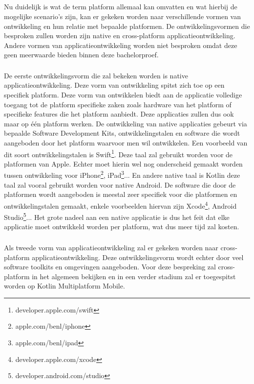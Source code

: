\subsection{}
\label{sec:SVZontwikkelingsvormen}

Nu duidelijk is wat de term platform allemaal kan omvatten en wat hierbij de mogelijke scenario's zijn, kan er gekeken worden naar verschillende vormen van ontwikkeling en hun relatie met bepaalde platformen. De ontwikkelingsvormen die besproken zullen worden zijn native en cross-platform applicatieontwikkeling. Andere vormen van applicatieontwikkeling worden niet besproken omdat deze geen meerwaarde bieden binnen deze bachelorproef.

\subsubsection{}
\label{sec:SVZnative}
De eerste ontwikkelingsvorm die zal bekeken worden is native applicatieontwikkeling. Deze vorm van ontwikkeling spitst zich toe op een specifiek platform. Deze vorm van ontwikkelen biedt aan de applicatie volledige toegang tot de platform specifieke zaken zoals hardware van het platform of specifieke features die het platform aanbiedt.\autocite{RahulRaj2012} Deze applicaties zullen dus ook maar op één platform werken. De ontwikkeling van native applicaties gebeurt via bepaalde Software Development Kits, ontwikkelingstalen en software die wordt aangeboden door het platform waarvoor men wil ontwikkelen.\autocite{Lim2015} Een voorbeeld van dit soort ontwikkelingstalen is Swift\footnote{developer.apple.com/swift}. Deze taal zal gebruikt worden voor de platformen van Apple. Echter moet hierin wel nog onderscheid gemaakt worden tussen ontwikkeling voor iPhone\footnote{apple.com/benl/iphone}, iPad\footnote{apple.com/benl/ipad}... En andere native taal is Kotlin deze taal zal vooral gebruikt worden voor native Android. De software die door de platformen wordt aangeboden is meestal zeer specifiek voor die platformen en ontwikkelingstalen gemaakt, enkele voorbeelden hiervan zijn Xcode\footnote{developer.apple.com/xcode}, Android Studio\footnote{developer.android.com/studio}... Het grote nadeel aan een native applicatie is dus het feit dat elke applicatie moet ontwikkeld worden per platform, wat dus meer tijd zal kosten.


\subsubsection{}
\label{sec:SVZcrossplatform}
Als tweede vorm van applicatieontwikkeling zal er gekeken worden naar cross-platform applicatieontwikkeling. Deze ontwikkelingsvorm wordt echter door veel software toolkits en omgevingen aangeboden. Voor deze bespreking zal cross-platform in het algemeen bekijken en in een verder stadium zal er toegespitst worden op Kotlin Multiplatform Mobile.

